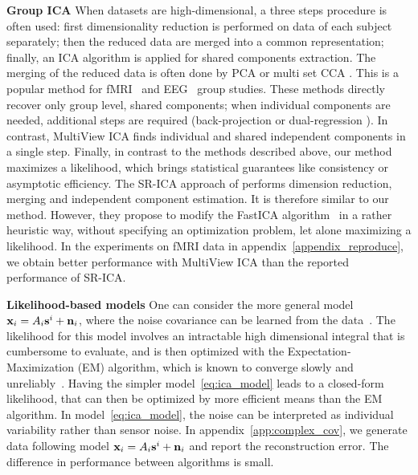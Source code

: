 \documentclass[12pt]{report}
\begin{document}
\textbf{Group ICA} When datasets are high-dimensional, a three steps procedure is often used: first dimensionality reduction is performed on data of each subject  separately; then the reduced data are merged into a common representation; finally, an ICA algorithm is applied for shared components extraction. The merging of the reduced data is often done by PCA \cite{calhoun2001method} or multi set CCA \cite{varoquaux2009canica}.
This is a popular method for fMRI~\cite{calhoun2009review} and EEG~\cite{eichele2011eegift} group studies.
These methods directly recover only group level, shared components; when individual components are needed, additional steps are required (back-projection \cite{calhoun2001method} or dual-regression \cite{beckmann2009group}).
%
In contrast, MultiView ICA finds individual and shared independent components in a single step.
%
%
Finally, in contrast to the methods described above, our method maximizes a likelihood, which brings statistical guarantees like consistency or asymptotic efficiency.
%
The SR-ICA approach of \cite{zhang2016searchlight} performs dimension reduction, merging and independent component estimation. It is therefore similar to our method.
%
However, they propose to modify the FastICA algorithm~\cite{hyvarinen1999fast} in a rather heuristic way, without specifying an optimization problem, let alone maximizing a likelihood. In the experiments on fMRI data in appendix~\ref{appendix_reproduce}, we obtain better performance with MultiView ICA than the reported performance of SR-ICA.
%
%

\textbf{Likelihood-based models} One can consider the more general model $\mathbf{x}_i = A_i\mathbf{s}^i + \mathbf{n}_i$, where the noise covariance can be learned from the data~\cite{guo2008unified}.
%
The likelihood for this model involves an intractable high dimensional integral that is cumbersome to evaluate, and is then optimized with the Expectation-Maximization (EM) algorithm, which is known to converge slowly and unreliably~\cite{bermond1999approximate, petersen2005slow}.
%
Having the simpler model~\eqref{eq:ica_model} leads to a closed-form likelihood, that can then be optimized by more efficient means than the EM algorithm.
In model~\eqref{eq:ica_model}, the noise can be interpreted as individual variability rather than sensor noise. %
In appendix~\ref{app:complex_cov}, we generate data following model $\mathbf{x}_i = A_i\mathbf{s}^i + \mathbf{n}_i$ and report the reconstruction error. The difference in performance between algorithms is small. 
%
%
%
\end{document}
